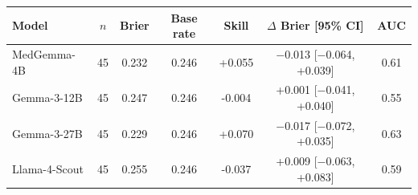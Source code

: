\begin{tabular}{lcccccc}
\toprule
Model & $n$ & Brier & Base rate & Skill & $\Delta$ Brier [95\% CI] & AUC \\
\midrule
MedGemma-4B & 45 & 0.232 & 0.246 & +0.055 & $-$0.013 [$-$0.064, +0.039] & 0.61 \\
Gemma-3-12B & 45 & 0.247 & 0.246 & -0.004 & +0.001 [$-$0.041, +0.040] & 0.55 \\
Gemma-3-27B & 45 & 0.229 & 0.246 & +0.070 & $-$0.017 [$-$0.072, +0.035] & 0.63 \\
Llama-4-Scout & 45 & 0.255 & 0.246 & -0.037 & +0.009 [$-$0.063, +0.083] & 0.59 \\
\bottomrule
\end{tabular}
